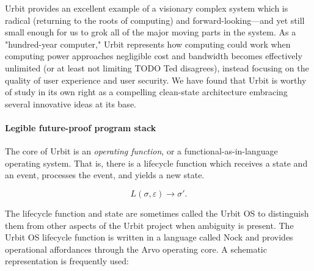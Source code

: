 Urbit provides an excellent example of a visionary complex system which is radical (returning to the roots of computing) and forward-looking—and yet still small enough for us to grok all of the major moving parts in the system.  As a "hundred-year computer," Urbit represents how computing could work when computing power approaches negligible cost and bandwidth becomes effectively unlimited (or at least not limiting TODO Ted disagrees), instead focusing on the quality of user experience and user security.  We have found that Urbit is worthy of study in its own right as a compelling clean-state architecture embracing several innovative ideas at its base.

\paragraph{Legible future-proof program stack}

The core of Urbit is an \emph{operating function}, or a functional-as-in-language operating system.  That is, there is a lifecycle function which receives a state and an event, processes the event, and yields a new state.

$$
L
(\sigma,\varepsilon)
\rightarrow
\sigma'
\textrm{.}
$$

The lifecycle function and state are sometimes called the Urbit OS to distinguish them from other aspects of the Urbit project when ambiguity is present.  The Urbit OS lifecycle function is written in a language called Nock and provides operational affordances through the Arvo operating core.  A schematic representation is frequently used:

